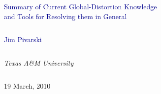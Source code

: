 \documentclass[compress]{beamer}
\begin{document}
\begin{frame}
\vfill
\begin{center}
\textcolor{darkblue}{\Large Summary of Current Global-Distortion Knowledge \\ \vspace{0.2 cm} and Tools for Resolving them in General}

\vfill
\begin{columns}
\begin{center}
\large
\textcolor{darkblue}{Jim Pivarski}
\end{center}
\end{columns}

\begin{columns}
\begin{center}
\scriptsize
{\it Texas A\&M University}
\end{center}
\end{columns}

\vfill
19 March, 2010

\end{center}
\end{frame}


\small
\end{document}
